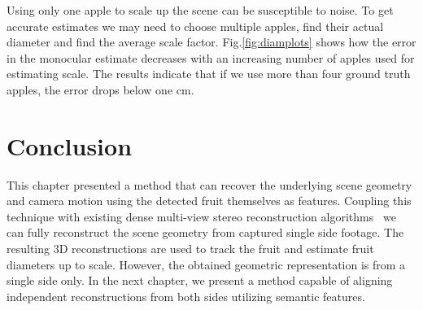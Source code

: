 Using only one apple to scale up the scene can be susceptible to noise. To get accurate estimates we may need to choose multiple apples, find their actual diameter and find the average scale factor. Fig.\ref{fig:diamplots} shows how the error in the monocular estimate decreases with an increasing number of apples used for estimating scale. The results indicate that if we use more than four ground truth apples, the error drops below one cm.

\section{Conclusion}\label{sec:isfm_conc}

This chapter presented a method that can recover the underlying scene geometry and camera motion using the detected fruit themselves as features. Coupling this technique with existing dense multi-view stereo reconstruction algorithms~\cite{goesele2007multi} we can fully reconstruct the scene geometry from captured single side footage. The resulting 3D reconstructions are used to track the fruit and estimate fruit diameters up to scale. However, the obtained geometric representation is from a single side only. In the next chapter, we present a method capable of aligning independent reconstructions from both sides utilizing semantic features.